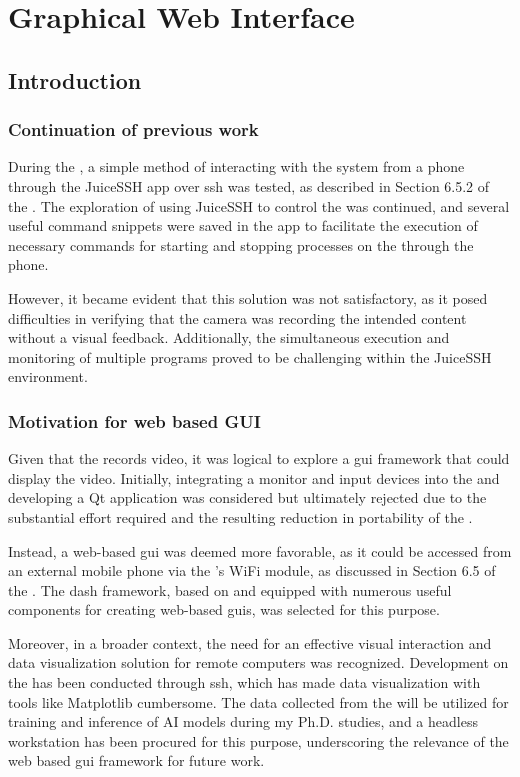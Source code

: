 \chapter{Graphical Web Interface}
\label{chap:gui}
\section{Introduction}
\subsection{Continuation of previous work}
During the \preproject, a simple method of interacting with the system from a phone through the JuiceSSH app over \gls{ssh} was tested, as described in Section 6.5.2 of the \preproject.
The exploration of using JuiceSSH to control the \sr was continued, and several useful command snippets were saved in the app to facilitate the execution of necessary commands for starting and stopping processes on the \jx through the phone.

However, it became evident that this solution was not satisfactory, as it posed difficulties in verifying that the camera was recording the intended content without a visual feedback.
Additionally, the simultaneous execution and monitoring of multiple programs proved to be challenging within the JuiceSSH environment.


\subsection{Motivation for web based GUI}
Given that the \sr records video, it was logical to explore a \gls{gui} framework that could display the video.
Initially, integrating a monitor and input devices into the \sr and developing a Qt application was considered but ultimately rejected due to the substantial effort required and the resulting reduction in portability of the \sr.

Instead, a web-based \gls{gui} was deemed more favorable, as it could be accessed from an external mobile phone via the \sr's WiFi module, as discussed in Section 6.5 of the \preproject.
The \gls{dash} framework, based on \py and equipped with numerous useful components for creating web-based \glspl{gui}, was selected for this purpose.

Moreover, in a broader context, the need for an effective visual interaction and data visualization solution for remote computers was recognized.
Development on the \jx has been conducted through \gls{ssh}, which has made data visualization with tools like Matplotlib cumbersome.
The data collected from the \sr will be utilized for training and inference of AI models during my Ph.D.
studies, and a headless workstation has been procured for this purpose, underscoring the relevance of the web based \gls{gui} framework for future work.


